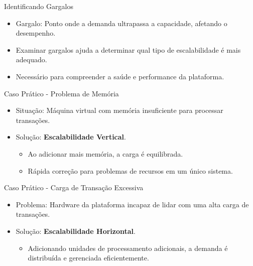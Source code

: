 \documentclass{beamer}
\begin{document}
\begin{frame}{Identificando Gargalos}
	\begin{itemize}
		\item Gargalo: Ponto onde a demanda ultrapassa a capacidade, afetando o desempenho.
		\item Examinar gargalos ajuda a determinar qual tipo de escalabilidade é mais adequado.
		\item Necessário para compreender a saúde e performance da plataforma.
	\end{itemize}
\end{frame}
\begin{frame}{Caso Prático - Problema de Memória}
	\begin{itemize}
		\item Situação: Máquina virtual com memória insuficiente para processar transações.
		\item Solução: \textbf{Escalabilidade Vertical}.
		      \begin{itemize}
			      \item Ao adicionar mais memória, a carga é equilibrada.
			      \item Rápida correção para problemas de recursos em um único sistema.
		      \end{itemize}
	\end{itemize}
\end{frame}
\begin{frame}{Caso Prático - Carga de Transação Excessiva}
	\begin{itemize}
		\item Problema: Hardware da plataforma incapaz de lidar com uma alta carga de transações.
		\item Solução: \textbf{Escalabilidade Horizontal}.
		      \begin{itemize}
			      \item Adicionando unidades de processamento adicionais, a demanda é distribuída e gerenciada eficientemente.
		      \end{itemize}
	\end{itemize}
\end{frame}
\end{document}

